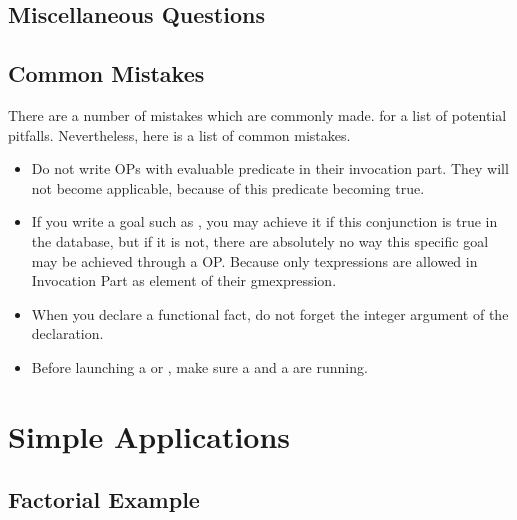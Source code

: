 \section{Miscellaneous Questions}


\section{Common Mistakes}

There are a number of mistakes which are commonly made.  for a list of potential pitfalls. Nevertheless, here is
a list of common mistakes.

\begin{itemize}

\item Do not write OPs with evaluable predicate in their invocation part.
They will not become applicable, because of this predicate becoming true.

\item If you write a goal such as ,
you may achieve it if this conjunction is true in the database, but if it
is not, there are absolutely no way this specific goal may be achieved
through a OP. Because only texpressions are allowed in Invocation Part as
element of their gmexpression.

\item When you declare a functional fact, do not forget the integer argument of
the declaration.

\item Before launching a \XPK{} or \CPK{}, make sure a \OPRSS{} and a \MPA{}
are running.

\end{itemize}

\chapter{Simple \COPRS{} Applications}



\section{Factorial Example}

